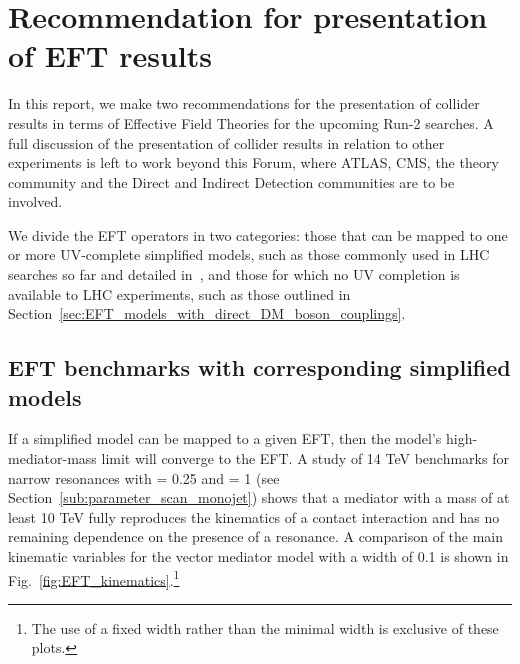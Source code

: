 \section{Recommendation for presentation of EFT results} %
\label{sec:RecommendationEFTResults}

In this report,
we make two recommendations for the presentation of collider results
in terms of Effective Field Theories for the upcoming Run-2 searches. 
A full discussion of the presentation of
collider results in relation to other experiments
is left to work beyond this Forum, where ATLAS, CMS, the theory community
and the Direct and Indirect Detection communities are to be involved. 

We divide the EFT operators in two categories: 
those that can be mapped to one or more UV-complete simplified models, such as those
commonly used in LHC searches so far and detailed in~\cite{Goodman:2010ku}, and those
for which no UV completion is available to LHC experiments, such as those outlined in Section~\ref{sec:EFT_models_with_direct_DM_boson_couplings}.

\subsection{EFT benchmarks with corresponding simplified models}
\label{sub:EFT_withSimp}

If a simplified model can be mapped to a given EFT, then the model's high-mediator-mass limit  will converge to the EFT.
A study of 14 TeV benchmarks for narrow resonances with \gq = 0.25 and \gDM = 1 (see Section~\ref{sub:parameter_scan_monojet})
shows that a mediator with a mass of at least 10 TeV fully reproduces the kinematics of a contact
interaction and has no remaining dependence on the presence of a resonance. 
A comparison of the main kinematic variables for the \schannel vector 
mediator model with a width of 0.1 \mMed
is shown in Fig.~\ref{fig:EFT_kinematics}.\footnote{The use of a fixed width rather than the minimal width is exclusive of these plots.} 

